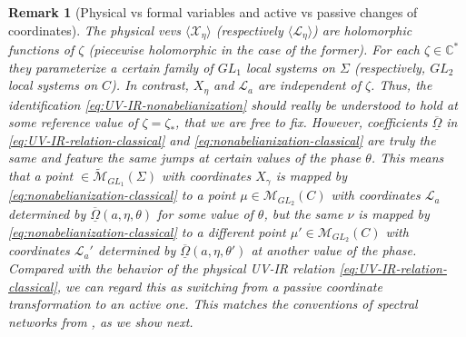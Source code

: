 \documentclass{article}
\numberwithin{equation}{section}
\newcommand{\IC}{\mathbb{C}}
\def\IC{{\mathbb{C}}}
\def\CL{\mathcal{L}}
\def\CM{{\mathcal{M}}}
\def\scL{\mathscr{L}}
\def\scX{\mathscr{X}}
\def\fOmega{\overline{\underline{\Omega}}}
\newtheorem{remark}{Remark}
\begin{document}
\begin{remark}[Physical vs formal variables and active vs passive changes of coordinates]
The physical vevs $\langle \scX_\eta\rangle$ (respectively $\langle \scL_\eta\rangle$) are holomorphic functions of $\zeta$ (piecewise holomorphic in the case of the former). 
For each $\zeta\in \IC^*$ they parameterize a certain family of $GL_1$ local systems on $\Sigma$ (respectively, $GL_2$ local systems on $C$). 
In contrast, $X_\eta$ and $\CL_a$ are independent of $\zeta$. 
Thus, the identification \eqref{eq:UV-IR-nonabelianization} should really be understood to hold at some reference value of $\zeta = \zeta_{*}$, that we are free to fix. 
However, coefficients $\fOmega$ in \eqref{eq:UV-IR-relation-classical} and \eqref{eq:nonabelianization-classical} are truly the same and feature the same jumps at certain values of the phase $\theta$.
This means that a point $\in \tilde \CM_{GL_1}(\Sigma)$ with coordinates $X_{\gamma}$ is mapped by \eqref{eq:nonabelianization-classical} to a point $\mu\in \CM_{GL_2}(C)$ with coordinates $\CL_a$ determined by $\fOmega(a,\eta,\theta)$ for some value of $\theta$, but the same $\nu$ is mapped by \eqref{eq:nonabelianization-classical} to a different point $\mu'\in \CM_{GL_2}(C)$ with coordinates $\CL_a'$ determined by $\fOmega(a,\eta,\theta')$ at another value of the phase.
Compared with the behavior of the physical UV-IR relation \eqref{eq:UV-IR-relation-classical}, we can regard this as switching from a passive coordinate transformation to an active one. This matches the conventions of spectral networks from \cite{Gaiotto:2012rg}, as we show next.
\end{remark}
\end{document}
